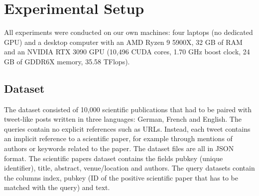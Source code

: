 \section{Experimental Setup}
\label{sec:setup}
All experiments were conducted on our own machines: four laptops (no dedicated GPU) and a desktop computer with an AMD Ryzen 9 5900X, 32 GB of RAM and an NVIDIA RTX 3090 GPU (10,496 CUDA cores, 1.70 GHz boost clock, 24 GB of GDDR6X memory, 35.58 TFlops).

\subsection{Dataset}
\label{sec:dataset}

The dataset consisted of 10,000 scientific publications that had to be paired with tweet-like posts written in three languages: German, French and English. The queries contain no explicit references such as URLs. Instead, each tweet contains an implicit reference to a scientific paper, for example through mentions of authors or keywords related to the paper. The dataset files are all in JSON format. The scientific papers dataset contains the fields pubkey (unique identifier), title, abstract, venue/location and authors. The query datasets contain the columns index, pubkey (ID of the positive scientific paper that has to be matched with the query) and text.


